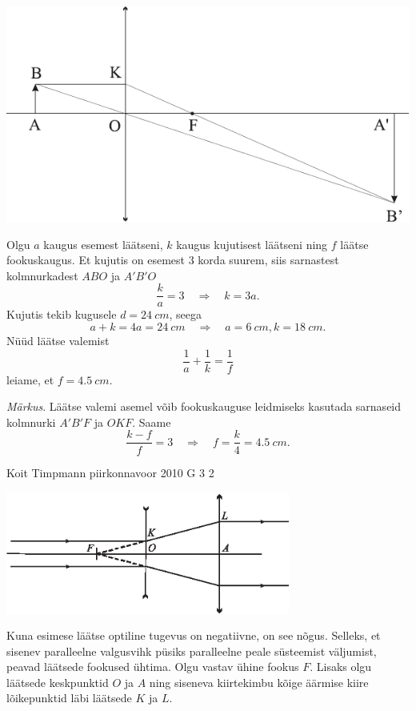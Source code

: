 \documentclass[11pt, twoside]{article}
\begin{document}
{{\begin{center}
	\includegraphics[width=0.9\linewidth]{2009-lahg-02-lah}
\end{center}

Olgu $a$ kaugus esemest läätseni, $k$ kaugus kujutisest läätseni ning $f$ läätse fookuskaugus. Et kujutis on esemest \num{3} korda suurem, siis sarnastest kolmnurkadest $ABO$ ja $A'B'O$
\[
\frac{k}{a}=3 \quad \Rightarrow \quad k=3 a.
\]
Kujutis tekib kugusele $d = \SI{24}{cm}$, seega
\[
a+k=4 a=\SI{24}{cm} \quad \Rightarrow \quad a=\SI{6}{cm}, k=\SI{18}{cm}.
\]
Nüüd läätse valemist
\[
\frac{1}{a}+\frac{1}{k}=\frac{1}{f}
\]
leiame, et $f = \SI{4,5}{cm}$.

\emph{Märkus}. Läätse valemi asemel võib fookuskauguse leidmiseks kasutada sarnaseid kolmnurki $A'B'F$ ja $OKF$. Saame
\[
\frac{k-f}{f}=3 \quad \Rightarrow \quad f=\frac{k}{4}=\SI{4,5}{cm}.
\]
\fi
}

{Koit Timpmann} %
{piirkonnavoor} %
{2010} %
{G 3} %
{2} %
{

\ifSolution
\begin{center}
	\includegraphics[width=0.7\textwidth]{2010-v2g-03-laiendi.eps}
\end{center}

Kuna esimese läätse optiline tugevus on negatiivne, on see nõgus. Selleks, et sisenev paralleelne valgusvihk püsiks paralleelne peale süsteemist väljumist, peavad läätsede fookused ühtima. Olgu vastav ühine fookus $F$. Lisaks olgu läätsede keskpunktid $O$ ja $A$ ning siseneva kiirtekimbu kõige äärmise kiire lõikepunktid läbi läätsede $K$ ja $L$.

}}
\end{document}
